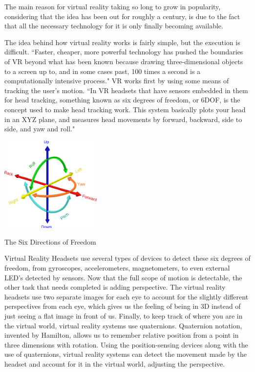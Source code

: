 \documentclass[12pt]{article}
\begin{document}
The main reason for virtual reality taking so long to grow in popularity, considering that the idea has been out for roughly a century, is due to the fact that all the necessary technology for it is only finally becoming available. 




The idea behind how virtual reality works is fairly simple, but the execution is difficult. ``Faster, cheaper, more powerful technology has pushed the boundaries of VR beyond what has been known because drawing three-dimensional objects to a screen up to, and in some cases past, 100 times a second is a computationally intensive process."
\cite{baruahVirtualRealityVRTK42020} VR works first by using some means of tracking the user's motion. ``In VR headsets that have sensors embedded in them for head tracking, something known as six degrees of freedom, or 6DOF, is the concept used to make head tracking work. This system basically plots your head in an XYZ plane, and measures head movements by forward, backward, side to side, and yaw and roll."
\cite{ThisEngineeringHow2020}
\begin{center}
\includegraphics[width = 5cm]{Image E.png}

The Six Directions of Freedom
\cite{SixDegreesFreedom}
\end{center} Virtual Reality Headsets use several types of devices to detect these six degrees of freedom, from gyroscopes, accelerometers, magnetometers, to even external LED's detected by sensors. \cite{ThisEngineeringHow2020}
Now that the full scope of motion is detectable, the other task that needs completed is adding perspective. The virtual reality headsets use two separate images for each eye to account for the slightly different perspectives from each eye, which gives us the feeling of being in 3D instead of just seeing a flat image in front of us.  Finally, to keep track of where you are in the virtual world, virtual reality systems use quaternions. Quaternion notation, invented by Hamilton, allows us to remember relative position from a point in three dimensions with rotation. Using the position-sensing devices along with the use of quaternions, virtual reality systems can detect the movement made by the headset and account for it in the virtual world, adjusting the perspective. \cite{grasnickBasicsVirtualReality2021a}
\end{document}
